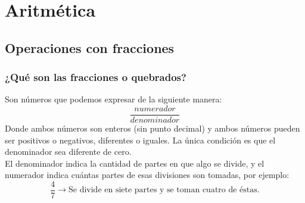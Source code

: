 \chapter{Aritmética}

\section{Operaciones con fracciones}

\subsection{¿Qué son las fracciones o quebrados?}
Son números que podemos expresar de la siguiente manera: 
\begin{equation}
\dfrac{numerador}{denominador}
\end{equation}
Donde ambos números son enteros (sin punto decimal) y ambos números pueden ser positivos o negativos, diferentes o iguales. La única condición es que el denominador sea diferente de cero.\\
El denominador indica la cantidad de partes en que algo se divide, y el numerador indica cuántas partes de esas divisiones son tomadas, por ejemplo:
\begin{equation*}
\dfrac{4}{7} \rightarrow \text{Se divide en siete partes y se toman cuatro de éstas.}
\end{equation*}

